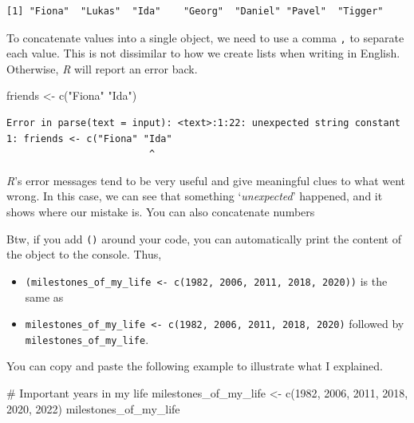 \documentclass[
  letterpaper,
  DIV=11,
  numbers=noendperiod]{scrreprt}
\newenvironment{Shaded}{\begin{snugshade}}{\end{snugshade}}
\newcommand{\CommentTok}[1]{\textcolor[rgb]{0.37,0.37,0.37}{#1}}
\newcommand{\DecValTok}[1]{\textcolor[rgb]{0.68,0.00,0.00}{#1}}
\newcommand{\FunctionTok}[1]{\textcolor[rgb]{0.28,0.35,0.67}{#1}}
\newcommand{\NormalTok}[1]{\textcolor[rgb]{0.00,0.23,0.31}{#1}}
\newcommand{\OtherTok}[1]{\textcolor[rgb]{0.00,0.23,0.31}{#1}}
\newcommand{\StringTok}[1]{\textcolor[rgb]{0.13,0.47,0.30}{#1}}
\begin{document}
\begin{verbatim}
[1] "Fiona"  "Lukas"  "Ida"    "Georg"  "Daniel" "Pavel"  "Tigger"
\end{verbatim}

To concatenate values into a single object, we need to use a comma
\texttt{,} to separate each value. This is not dissimilar to how we
create lists when writing in English. Otherwise, \emph{R} will report an
error back.

\begin{Shaded}
\begin{Highlighting}[]
\NormalTok{friends }\OtherTok{\textless{}{-}} \FunctionTok{c}\NormalTok{(}\StringTok{"Fiona"} \StringTok{"Ida"}\NormalTok{)}
\end{Highlighting}
\end{Shaded}

\begin{verbatim}
Error in parse(text = input): <text>:1:22: unexpected string constant
1: friends <- c("Fiona" "Ida"
                         ^
\end{verbatim}

\emph{R}'s error messages tend to be very useful and give meaningful
clues to what went wrong. In this case, we can see that something
`\emph{unexpected}' happened, and it shows where our mistake is. You can
also concatenate numbers

Btw, if you add \texttt{()} around your code, you can automatically
print the content of the object to the console. Thus,

\begin{itemize}
\item
  \texttt{(milestones\_of\_my\_life\ \textless{}-\ c(1982,\ 2006,\ 2011,\ 2018,\ 2020))}
  is the same as
\item
  \texttt{milestones\_of\_my\_life\ \textless{}-\ c(1982,\ 2006,\ 2011,\ 2018,\ 2020)}
  followed by \texttt{milestones\_of\_my\_life}.
\end{itemize}

You can copy and paste the following example to illustrate what I
explained.

\begin{Shaded}
\begin{Highlighting}[]
\CommentTok{\# Important years in my life}
\NormalTok{milestones\_of\_my\_life }\OtherTok{\textless{}{-}} \FunctionTok{c}\NormalTok{(}\DecValTok{1982}\NormalTok{, }\DecValTok{2006}\NormalTok{, }\DecValTok{2011}\NormalTok{, }\DecValTok{2018}\NormalTok{, }\DecValTok{2020}\NormalTok{, }\DecValTok{2022}\NormalTok{)}
\NormalTok{milestones\_of\_my\_life}
\end{Highlighting}
\end{Shaded}
\end{document}

